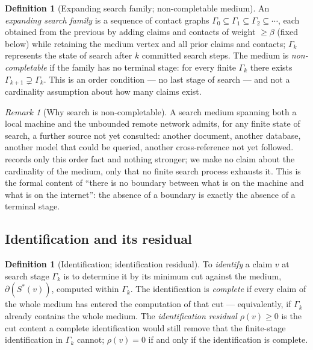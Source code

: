 \documentclass[11pt,twocolumn,a4paper]{article}
\theoremstyle{thmstyle}
\theoremstyle{definition}
\newtheorem{definition}[theorem]{Definition}
\theoremstyle{remark}
\newtheorem{remark}[theorem]{Remark}
\newcommand{\Gph}{\Gamma}
\newcommand{\flo}{\beta}
\newcommand{\cut}{\partial}
\newcommand{\res}{\rho}
\begin{document}
\begin{definition}[Expanding search family; non-completable medium]
\label{def:noncompletable}
An \emph{expanding search family} is a sequence of contact graphs
$\Gph_0\subseteq\Gph_1\subseteq\Gph_2\subseteq\cdots$, each obtained from
the previous by adding claims and contacts of weight $\ge\flo$ (fixed
below) while retaining the medium vertex and all prior claims and
contacts; $\Gph_k$ represents the state of search after $k$ committed
search steps. The medium is \emph{non-completable} if the family has no
terminal stage: for every finite $\Gph_k$ there exists $\Gph_{k+1}
\supsetneq\Gph_k$. This is an order condition --- no last stage of search
--- and not a cardinality assumption about how many claims exist.
\end{definition}

\begin{remark}[Why search is non-completable]
\label{rem:why-noncompletable}
A search medium spanning both a local machine and the unbounded remote
network admits, for any finite state of search, a further source not yet
consulted: another document, another database, another model that could be
queried, another cross-reference not yet followed. 
records only this order fact and nothing stronger; we make no claim about
the cardinality of the medium, only that no finite search process
exhausts it. This is the formal content of ``there is no boundary between
what is on the machine and what is on the internet'': the absence of a
boundary is exactly the absence of a terminal stage.
\end{remark}

\subsection{Identification and its residual}

\begin{definition}[Identification; identification residual]
\label{def:identification}
To \emph{identify} a claim $v$ at search stage $\Gph_k$ is to determine it
by its minimum cut against the medium, $\cut(S^{\ast}(v))$, computed within
$\Gph_k$. The identification is \emph{complete} if every claim of the whole
medium has entered the computation of that cut --- equivalently, if
$\Gph_k$ already contains the whole medium. The \emph{identification
residual} $\res(v)\ge0$ is the cut content a complete identification would
still remove that the finite-stage identification in $\Gph_k$ cannot;
$\res(v)=0$ if and only if the identification is complete.
\end{definition}
\end{document}
